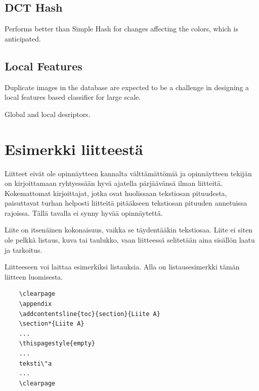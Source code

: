 \documentclass[english,12pt,a4paper,pdftex,elec,utf8]{aaltothesis}
\begin{document}
\subsection{DCT Hash}
Performs better than Simple Hash for changes affecting the colors, which is anticipated.

\subsection{Local Features}

Duplicate images in the database are expected to be a challenge in designing a local features based classifier for large scale.

Global and local desriptors.

\clearpage


{}

{}

\clearpage

\thesisappendix

\section{Esimerkki liitteest\"a\label{LiiteA}}

Liitteet eiv\"at ole opinn\"aytteen kannalta v\"altt\"am\"att\"omi\"a ja
opinn\"aytteen tekij\"an on
kirjoittamaan ryhtyess\"a\"an hyv\"a ajatella p\"arj\"a\"av\"ans\"a ilman liitteit\"a.
Kokemattomat kirjoittajat, jotka ovat huolissaan
tekstiosan pituudesta, paisuttavat turhan
helposti liitteit\"a pit\"a\"akseen tekstiosan pituuden annetuissa rajoissa.
T\"all\"a tavalla ei synny hyv\"a\"a opinn\"aytett\"a.

Liite on itsen\"ainen kokonaisuus, vaikka se t\"aydent\"a\"akin tekstiosaa.
Liite ei siten ole pelkk\"a listaus, kuva tai taulukko, vaan
liitteess\"a selitet\"a\"an aina sis\"all\"on laatu ja tarkoitus.

Liitteeseen voi laittaa esimerkiksi listauksia. Alla on
listausesimerkki t\"am\"an liitteen luomisesta.

\begin{verbatim}
	\clearpage
	\appendix
	\addcontentsline{toc}{section}{Liite A}
	\section*{Liite A}
	...
	\thispagestyle{empty}
	...
	teksti\"a
	...
	\clearpage
\end{verbatim}
\end{document}
